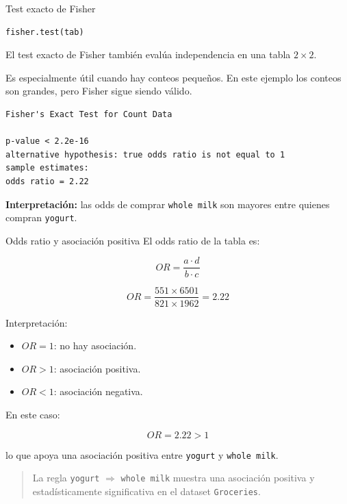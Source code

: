 \documentclass[10pt,aspectratio=169]{beamer}
\begin{document}
\begin{frame}[fragile]{Test exacto de Fisher}
\begin{lstlisting}[style=Rstyle]
fisher.test(tab)
\end{lstlisting}

\vspace{0.3cm}
El test exacto de Fisher también evalúa independencia en una tabla $2\times2$.

\vspace{0.2cm}
Es especialmente útil cuando hay conteos pequeños. En este ejemplo los conteos son grandes, pero Fisher sigue siendo válido.


\begin{lstlisting}[style=Rstyle]
Fisher's Exact Test for Count Data

p-value < 2.2e-16
alternative hypothesis: true odds ratio is not equal to 1
sample estimates:
odds ratio = 2.22
\end{lstlisting}

\vspace{0.2cm}
\textbf{Interpretación:} las odds de comprar \texttt{whole milk} son mayores entre quienes compran \texttt{yogurt}.
\end{frame}

\begin{frame}{Odds ratio y asociación positiva}
El odds ratio de la tabla es:

\[
OR = \frac{a \cdot d}{b \cdot c}
\]

\[
OR = \frac{551 \times 6501}{821 \times 1962} = 2.22
\]

\vspace{0.4cm}
Interpretación:

\begin{itemize}
  \item $OR = 1$: no hay asociación.
  \item $OR > 1$: asociación positiva.
  \item $OR < 1$: asociación negativa.
\end{itemize}

\vspace{0.3cm}
En este caso:

\[
OR = 2.22 > 1
\]

lo que apoya una asociación positiva entre \texttt{yogurt} y \texttt{whole milk}.

\begin{quote}
La regla \texttt{yogurt} $\Rightarrow$ \texttt{whole milk} muestra una asociación positiva y estadísticamente significativa en el dataset \texttt{Groceries}.
\end{quote}

\end{frame}
\end{document}
